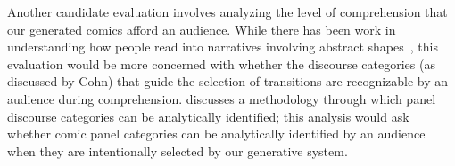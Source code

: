 Another candidate evaluation involves analyzing the level of comprehension
that our generated comics afford an audience. While there has been work in
understanding how people read into narratives involving abstract
shapes~, this evaluation would be more 
concerned with whether the discourse categories (as discussed by Cohn) that
guide the selection of transitions are recognizable by an audience during
comprehension.  discusses a methodology through 
which panel discourse categories can be analytically identified; this analysis
would ask whether comic panel categories can be analytically identified by
an audience when they are intentionally selected by our generative system.







